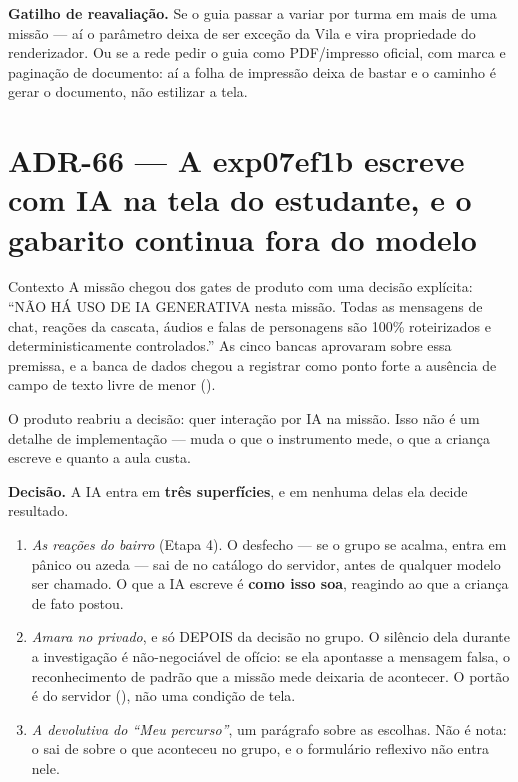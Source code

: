 \textbf{Gatilho de reavaliação.} Se o guia passar a variar por turma em mais de
uma missão --- aí o parâmetro deixa de ser exceção da Vila e vira propriedade do
renderizador. Ou se a rede pedir o guia como PDF/impresso oficial, com marca e
paginação de documento: aí a folha de impressão deixa de bastar e o caminho é
gerar o documento, não estilizar a tela.

\section{ADR-66 --- A exp07ef1b escreve com IA na tela do estudante, e o gabarito
continua fora do modelo}
\label{adr:exp07ef1b-ia-em-runtime}

\begin{especificacao}{Contexto}
A missão  chegou dos gates de produto com uma decisão
explícita: \enquote{NÃO HÁ USO DE IA GENERATIVA nesta missão. Todas as
mensagens de chat, reações da cascata, áudios e falas de personagens são 100\%
roteirizados e deterministicamente controlados.} As cinco bancas aprovaram
sobre essa premissa, e a banca de dados chegou a registrar como ponto forte a
ausência de campo de texto livre de menor ().

O produto reabriu a decisão: quer interação por IA na missão. Isso não é um
detalhe de implementação --- muda o que o instrumento mede, o que a criança
escreve e quanto a aula custa.
\end{especificacao}

\textbf{Decisão.} A IA entra em \textbf{três superfícies}, e em nenhuma delas
ela decide resultado.

\begin{enumerate}
  \item \emph{As reações do bairro} (Etapa 4). O desfecho --- se o grupo se
    acalma, entra em pânico ou azeda --- sai de  no catálogo
    do servidor, antes de qualquer modelo ser chamado. O que a IA escreve é
    \textbf{como isso soa}, reagindo ao que a criança de fato postou.
  \item \emph{Amara no privado}, e só DEPOIS da decisão no grupo. O silêncio
    dela durante a investigação é não-negociável de ofício: se ela apontasse a
    mensagem falsa, o reconhecimento de padrão que a missão mede deixaria de
    acontecer. O portão é do servidor (), não uma condição
    de tela.
  \item \emph{A devolutiva do \enquote{Meu percurso}}, um parágrafo sobre as
    escolhas. Não é nota: o  sai de  sobre o
    que aconteceu no grupo, e o formulário reflexivo não entra nele.
\end{enumerate}

